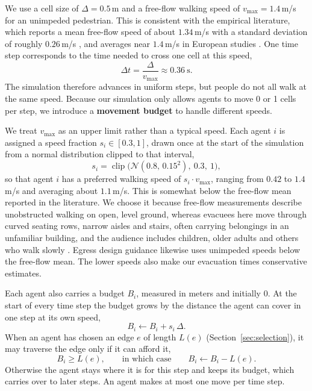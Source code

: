 \documentclass{article}
\begin{document}
We use a cell size of $\Delta = 0.5$\,m and a free-flow walking speed of
$v_{\max} = 1.4$\,m/s for an unimpeded pedestrian. This is consistent with the
empirical literature, which reports a mean free-flow speed of about
$1.34$\,m/s with a standard deviation of roughly $0.26$\,m/s
\cite{weidmann1993,helbing1995}, and averages near $1.4$\,m/s in European
studies \cite{daamen2007}. One time step corresponds to the time needed to
cross one cell at this speed,
\begin{equation}
    \Delta t = \frac{\Delta}{v_{\max}} \approx 0.36\ \text{s}.
\end{equation}
The simulation therefore advances in uniform steps, but people do not all walk
at the same speed. Because our simulation only allows agents to move 0 or 1
cells per step, we introduce a \textbf{movement budget} to handle different
speeds.

We treat $v_{\max}$ as an upper limit rather than a typical speed. Each agent $i$ is assigned a speed fraction $s_i \in [0.3, 1]$, drawn once at the start of the simulation from a normal distribution clipped to that interval,
\begin{equation}
    s_i = \operatorname{clip}\!\big(\mathcal{N}(0.8,\,0.15^2),\ 0.3,\ 1\big),
\end{equation}
so that agent $i$ has a preferred walking speed of $s_i \cdot v_{\max}$, ranging from $0.42$ to $1.4$\,m/s and averaging about $1.1$\,m/s. This is somewhat below the free-flow mean reported in the literature. We choose it because free-flow measurements describe unobstructed walking on open, level ground, whereas evacuees here move through curved seating rows, narrow aisles and stairs, often carrying belongings in an unfamiliar building, and the audience includes children, older adults and others who walk slowly \cite{bohannon1997}. Egress design guidance likewise uses unimpeded speeds below the free-flow mean. The lower speeds also make our evacuation times conservative estimates.

Each agent also carries a budget $B_i$, measured in meters and initially $0$. At the start of every time step the budget grows by the distance the agent can cover in one step at its own speed,
\begin{equation}
    B_i \leftarrow B_i + s_i\,\Delta .
\end{equation}
When an agent has chosen an edge $e$ of length $L(e)$ (Section~\ref{sec:selection}), it may traverse the edge only if it can afford it,
\begin{equation}
    B_i \ge L(e), \qquad \text{in which case} \qquad B_i \leftarrow B_i - L(e).
\end{equation}
Otherwise the agent stays where it is for this step and keeps its budget, which carries over to later steps. An agent makes at most one move per time step.
\end{document}
